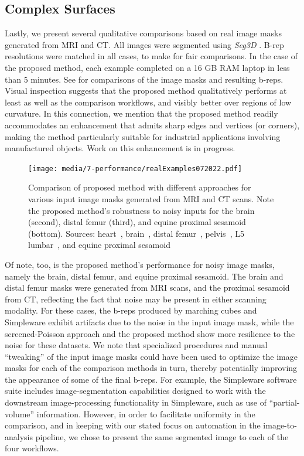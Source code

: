 \subsection{Complex Surfaces}
\label{Complex Surfaces}

Lastly, we present several qualitative comparisons based on real image masks generated from MRI and CT.  All images were segmented using \textit{Seg3D} \cite{Seg3D}.  B-rep resolutions were matched in all cases, to make for fair comparisons.  In the case of the proposed method, each example completed on a 16 GB RAM laptop in less than 5 minutes. See  for comparisons of the image masks and resulting b-reps.  Visual inspection suggests that the proposed method qualitatively performs at least as well as the comparison workflows, and visibly better over regions of low curvature.   In this connection, we mention that the proposed method readily accommodates an enhancement that admits sharp edges and vertices (or corners), making the method particularly suitable for industrial applications involving manufactured objects.  Work on this enhancement is in progress.  
\begin{figure}[h!]
	\centering
	 \texttt{[image: media/7-performance/realExamples072022.pdf]}
	\caption{{Comparison of proposed method with different approaches for various input image masks generated from MRI and CT scans. Note the proposed method's robustness to noisy inputs for the brain (second), distal femur (third), and equine proximal sesamoid (bottom). Sources: heart~\cite{cvgg}, brain~\cite{marcus_2007}, distal femur~\cite{epperson_2013}, pelvis~\cite{clark_2013}, L5 lumbar~\cite{yao_2016}, and equine proximal sesamoid~\cite{shaffer2021}}}
	\label{fig:example-meshes}
\end{figure}

Of note, too, is the proposed method's performance for noisy image masks, namely the brain, distal femur, and equine proximal sesamoid. The brain and distal femur masks were generated from MRI scans, and the proximal sesamoid from CT, reflecting the fact that noise may be present in either scanning modality.  For these cases, the b-reps produced by marching cubes and Simpleware exhibit artifacts due to the noise in the input image mask, while the screened-Poisson approach and the proposed method show more resilience to the noise for these datasets.  We note that specialized procedures and manual ``tweaking'' of the input image masks could have been used to optimize the image masks for each of the comparison methods in turn, thereby potentially improving the appearance of some of the final b-reps.  For example, the Simpleware software suite includes image-segmentation capabilities designed to work with the downstream image-processing functionality in Simpleware, such as use of ``partial-volume'' information.  However, in order to facilitate uniformity in the comparison, and in keeping with our stated focus on automation in the image-to-analysis pipeline, we chose to present the same segmented image to each of the four workflows.

